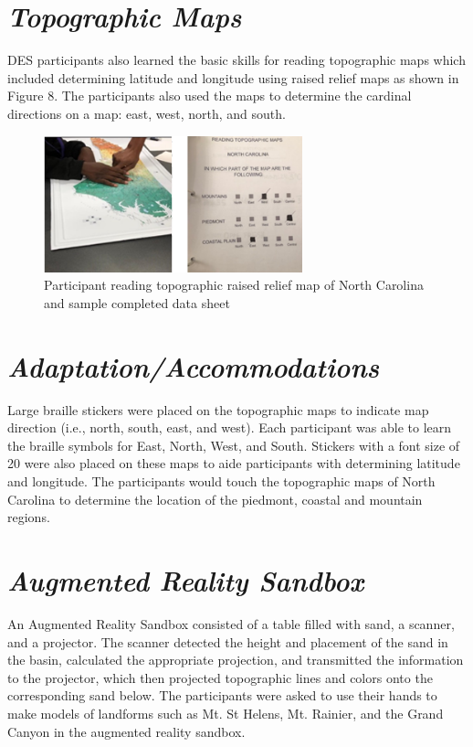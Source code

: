 \documentclass[11pt]{sig-alternate}
\begin{document}
\begin{large}
\section*{\textit{Topographic Maps}}
DES participants also learned the basic skills for reading topographic maps which included determining latitude and longitude using raised relief maps as shown in Figure 8. The participants also used the maps to determine the cardinal directions on a map: east, west, north, and south.  

{\begin{figure}[htp] 
    \leftmargin
    \includegraphics[width=7.5cm]{figure8.png}
    \caption{Participant reading topographic raised relief map of North Carolina and sample completed data sheet }
    \label{ Participant reading topographic raised relief map of North Carolina and sample completed data sheet  }
\end{figure}
}
\section*{\textit{Adaptation/Accommodations}}
Large braille stickers were placed on the topographic maps to indicate map direction  (i.e., north, south, east, and west).  Each participant was able to learn the braille symbols for East, North, West, and South.  Stickers with a font size of 20 were also placed on these maps to aide participants with determining latitude and longitude. The participants would touch the topographic maps of North Carolina to determine the location of the piedmont, coastal and mountain regions.

\section*{\textit{Augmented Reality Sandbox}}
An Augmented Reality Sandbox consisted of a table filled with sand, a scanner, and a projector. The scanner detected the height and placement of the sand in the basin, calculated the appropriate projection, and transmitted the information to the projector, which then projected topographic lines and colors onto the corresponding sand below. The participants were asked to use their hands to make models of landforms such as Mt. St Helens, Mt. Rainier, and the Grand Canyon in the augmented reality sandbox.  


\end{large}
\end{document}
